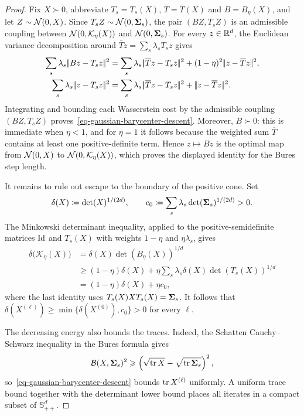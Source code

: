 \begin{proof}
	Fix $X\succ0$, abbreviate $T_s=T_s(X)$, $\overline T=\overline T(X)$ and $B=B_\eta(X)$, and let $Z\sim\mathcal{N}(0,X)$. Since $T_sZ\sim\mathcal{N}(0,\mathbf{\Sigma}_s)$, the pair $(BZ,T_sZ)$ is an admissible coupling between $\mathcal{N}(0,\mathcal K_\eta(X))$ and $\mathcal{N}(0,\mathbf{\Sigma}_s)$. For every $z\in\mathbb{R}^d$, the Euclidean variance decomposition around $\overline Tz=\sum_s\lambda_sT_sz$ gives
	\begin{align*}
		\sum_s\lambda_s\norm{Bz-T_sz}^2
		&=
		\sum_s\lambda_s\norm{\overline Tz-T_sz}^2
		+(1-\eta)^2\norm{z-\overline Tz}^2,
		\\
		\sum_s\lambda_s\norm{z-T_sz}^2
		&=
		\sum_s\lambda_s\norm{\overline Tz-T_sz}^2
		+\norm{z-\overline Tz}^2.
	\end{align*}
	Integrating and bounding each Wasserstein cost by the admissible coupling $(BZ,T_sZ)$ proves~\eqref{eq-gaussian-barycenter-descent}. Moreover, $B\succ0$: this is immediate when $\eta<1$, and for $\eta=1$ it follows because the weighted sum $\overline T$ contains at least one positive-definite term. Hence $z\mapsto Bz$ is the optimal map from $\mathcal{N}(0,X)$ to $\mathcal{N}(0,\mathcal K_\eta(X))$, which proves the displayed identity for the Bures step length.

	It remains to rule out escape to the boundary of the positive cone. Set
	\[
		\delta(X)\coloneqq\det(X)^{1/(2d)},
		\qquad
		c_0\coloneqq\sum_s\lambda_s\det(\mathbf{\Sigma}_s)^{1/(2d)}>0.
	\]
	The Minkowski determinant inequality, applied to the positive-semidefinite matrices $\mathrm{Id}$ and $T_s(X)$ with weights $1-\eta$ and $\eta\lambda_s$, gives
	\begin{align*}
		\delta\bigl(\mathcal K_\eta(X)\bigr)
		&=
		\delta(X)\det(B_\eta(X))^{1/d}
		\\
		&\geq
		(1-\eta)\delta(X)
		+
		\eta\sum_s\lambda_s
		\delta(X)\det(T_s(X))^{1/d}
		\\
		&=
		(1-\eta)\delta(X)+\eta c_0,
	\end{align*}
	where the last identity uses $T_s(X)XT_s(X)=\mathbf{\Sigma}_s$. It follows that
	$\delta(X^{(\ell)})\geq\min\{\delta(X^{(0)}),c_0\}>0$ for every $\ell$.

	The decreasing energy also bounds the traces. Indeed, the Schatten Cauchy--Schwarz inequality in the Bures formula gives
	\[
		\mathcal{B}(X,\mathbf{\Sigma}_s)^2
		\geqslant
		\left( \sqrt{\operatorname{tr} X}-\sqrt{\operatorname{tr}\mathbf{\Sigma}_s} \right)^2,
	\]
	so~\eqref{eq-gaussian-barycenter-descent} bounds $\operatorname{tr} X^{(\ell)}$ uniformly. A uniform trace bound together with the determinant lower bound places all iterates in a compact subset of $\mathbb S_{++}^d$.


\end{proof}
